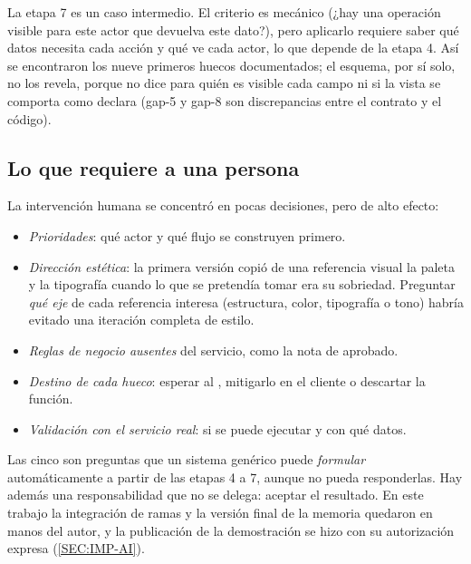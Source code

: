 La etapa 7 es un caso intermedio. El criterio es mecánico (¿hay una operación visible para
este actor que devuelva este dato?), pero aplicarlo requiere saber qué datos necesita cada
acción y qué ve cada actor, lo que depende de la etapa 4. Así se encontraron los nueve
primeros huecos documentados; el esquema, por sí solo, no los revela, porque no dice para
quién es visible cada campo ni si la vista se comporta como declara (gap-5 y gap-8 son
discrepancias entre el contrato y el código).

\subsection{Lo que requiere a una persona}

La intervención humana se concentró en pocas decisiones, pero de alto efecto:
\begin{itemize}
  \item \emph{Prioridades}: qué actor y qué flujo se construyen primero.
  \item \emph{Dirección estética}: la primera versión copió de una referencia visual la paleta
        y la tipografía cuando lo que se pretendía tomar era su sobriedad. Preguntar
        \emph{qué eje} de cada referencia interesa (estructura, color, tipografía o tono)
        habría evitado una iteración completa de estilo.
  \item \emph{Reglas de negocio ausentes} del servicio, como la nota de aprobado.
  \item \emph{Destino de cada hueco}: esperar al , mitigarlo en el cliente o
        descartar la función.
  \item \emph{Validación con el servicio real}: si se puede ejecutar y con qué datos.
\end{itemize}
Las cinco son preguntas que un sistema genérico puede \emph{formular} automáticamente a partir
de las etapas 4 a 7, aunque no pueda responderlas. Hay además una responsabilidad que no se
delega: aceptar el resultado. En este trabajo la integración de ramas y la versión final de
la memoria quedaron en manos del autor, y la publicación de la demostración se hizo con su
autorización expresa (\cref{SEC:IMP-AI}).
